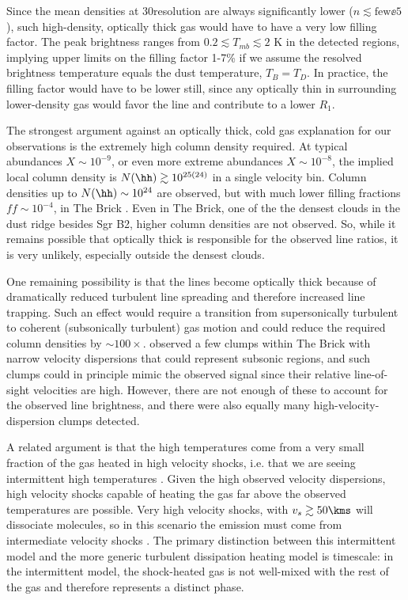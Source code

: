 Since the mean densities at 30\arcsec resolution are always significantly lower
($n\lesssim\mathrm{few}\ee{5}$ \percc), such high-density,
optically thick gas would have to have a very low filling factor.  The peak
\para \threeohthree brightness ranges from $0.2 \lesssim T_{mb} \lesssim 2$ K
in the detected regions, implying upper limits on the filling factor 1-7\% if
we assume the resolved brightness temperature equals the dust temperature,
$T_B=T_D$.
In practice, the filling factor would have to be lower still, since any
optically thin \para in surrounding lower-density gas would favor the
\threeohthree line and contribute to a lower $R_1$.

The strongest argument against an optically thick, cold gas explanation for our
observations is the extremely high column
density required.  At typical \para abundances $X\sim10^{-9}$, or even more
extreme abundances $X\sim10^{-8}$, the implied local column density is
$N(\hh)\gtrsim10^{25(24)}$ \persc in a single velocity bin.  Column densities
up to $N(\hh)\sim10^{24}$ \persc are observed, but with much lower filling
fractions $ff\sim10^{-4}$, in The Brick \citep[][their Figure
4]{Rathborne2014b}.  Even in The Brick, one of the the densest clouds in the
dust ridge besides Sgr B2, higher column densities are not observed.  So, while
it remains possible that optically thick
\para is responsible for the observed line ratios, it is very unlikely,
especially outside the densest clouds.

One remaining possibility is that the \para lines become optically thick
because of dramatically reduced turbulent line spreading and therefore
increased line trapping.  Such an effect would require a transition from
supersonically turbulent to coherent (subsonically turbulent) gas motion
\citep[e.g.][]{Pineda2010a} and could reduce the required column densities by
$\sim100\times$.   \citet{Kauffmann2013a} observed a few clumps within The
Brick with narrow velocity dispersions that could represent subsonic regions,
and such clumps could in principle mimic the observed signal since their
relative line-of-sight velocities are high.  However, there are not enough of
these to account for the observed line brightness, and there were also equally
many high-velocity-dispersion clumps detected. 

A related argument is that the high temperatures come from a very small
fraction of the gas heated in high velocity shocks, i.e. that we are seeing
intermittent high temperatures \citep[e.g.][]{Falgarone1995a}.  Given the high
observed velocity dispersions, high velocity shocks capable of heating the gas
far above the observed temperatures are possible.  Very high velocity shocks,
with $v_s \gtrsim 50 \kms$ will dissociate molecules, so in this scenario the
emission must come from intermediate velocity shocks \citep{Neufeld1989a}.  The
primary distinction between this intermittent model and the more generic
turbulent dissipation heating model is timescale: in the intermittent model,
the shock-heated gas is not well-mixed with the rest of the gas and therefore
represents a distinct phase.  


